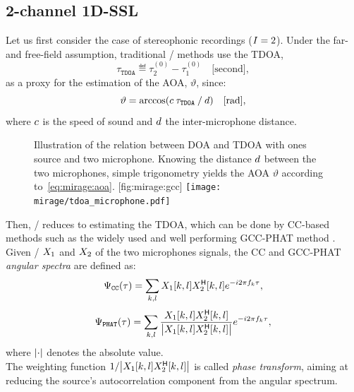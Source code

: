 \subsection{2-channel 1D-SSL}\label{subsec:mirage:1D-SSL}
\newcommand{\tdoa}{\ensuremath{\tau_\mathtt{TDOA}}}
\newcommand{\aoa}{\ensuremath{\vartheta}}
Let us first consider the case of stereophonic recordings ($I=2$).
Under the far- and free-field assumption, traditional \SSL/ methods use the \acf{TDOA},
\begin{equation*}
    \tdoa \eqdef \tau^{(0)}_2 - \tau^{(0)}_1\quad\text{[second]}
    ,
\end{equation*}
as a proxy for the estimation of the \ac{AOA}, $\aoa$, since:
\begin{equation}\label{eq:mirage:aoa}
    \vartheta = \arccos \kparen{\speedOfSound \: \tdoa \: / \: \distMicMic }\quad\text{[rad]},
\end{equation}
where $c$ is the speed of sound and $d$ the inter-microphone distance.

\begin{figure}
    \begin{sidecaption}[]{
        Illustration of the relation between \ac{DOA} and \ac{TDOA} with ones source and two microphone.
        Knowing the distance $d$ between the two microphones, simple trigonometry yields the \ac{AOA} $\vartheta$ according to~\cref{eq:mirage:aoa}.
    }[fig:mirage:gcc]
        \texttt{[image: mirage/tdoa\_microphone.pdf]}
    \end{sidecaption}
\end{figure}


\mynewline
Then, \SSL/ reduces to estimating the \ac{TDOA}, which can be done by \ac{CC}-based methods such as the widely used and well performing \ac{GCC-PHAT} method .
Given \STFT/ $X_1$ and $X_2$ of the two microphones signals, the \ac{CC} and \ac{GCC-PHAT} \textit{angular spectra} are defined as:
\begin{equation}\label{eq:mirage:cc}
    \Psi_\mathtt{CC}(\tau) = \sum_{k,l} X_1[k,l] {\ensuremath{X}}^{\mathsf{H}}_2[k,l] {e}^{-{i} 2  \pi f_k \tau}
    ,
    \end{equation}
\begin{equation}\label{eq:mirage:gccphat}
    \Psi_\mathtt{PHAT}(\tau) = \sum_{k,l}\frac{\MIC_1[k,l] \khermitian{\MIC}_2[k,l]}{\kvbar{ \MIC_1[k,l] \khermitian{\MIC}_2[k,l] }} \cste^{-\csti 2  \pi f_k \tau}
    ,
\end{equation}
where $\kvbar{\cdot}$ denotes the absolute value.
\\The weighting function $1 / \kvbar{ \MIC_1[k,l] \khermitian{\MIC}_2[k,l]}$ is called \textit{phase transform},
aiming at reducing the source's autocorrelation component from the angular spectrum.

